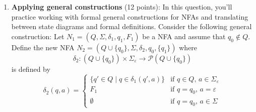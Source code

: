 \documentclass[12pt, oneside]{article}
\newcommand{\gradeCorrect}{({\it Graded for correctness}) }
\begin{document}
\begin{enumerate}[wide, labelwidth=!, labelindent=0pt]
For each of the regular expressions $R$ over the alphabet $\Sigma = \{a,b\}$ below, write the regular 
expression for~$\overline{L(R)}$. Your regular expressions may use the symbols
$\varnothing$, $\varepsilon$, $a$, $b$, and the 
following operations to combine them: union, concatenation, 
and Kleene star.

Briefly justify why your solution for each part works by giving plain English descriptions of the language 
described by the regular expression and of its complement and connecting them to the regular 
expression via relevant definitions. An English description that is more 
detailed than simply negating the description in the original language will likely be helpful in the justification.

Alternatively, you can justify your solution by first designing a DFA that recognizes $L(R)$, 
using the construction from class and the book to modify this DFA to get a new DFA that recognizes~$\overline{L(R)}$, 
and then applying the constructions from class and the book to convert this new DFA to a regular expression.

For each part of the question, clearly state which approach you're taking and include enough intermediate
steps to illustrate your work.


\begin{enumerate}
    \item\gradeCorrect $a^*b^*$
    \item\gradeCorrect $(a \cup b) a b^*$
\end{enumerate}


\item\textbf{Applying general constructions} (12 points):
In this question, you'll practice working with formal general constructions
for NFAs and translating between state diagrams and formal definitions.
Consider the following general construction: Let $N_1 = (Q, \Sigma, \delta_1, q_1, F_1)$ be a NFA
and assume that $q_0 \notin Q$.
Define the new NFA $N_2 = (Q \cup \{q_0\}, \Sigma, \delta_2, q_0, \{q_1\})$ where 
$$\delta_2: (Q \cup \{q_0\}) \times \Sigma_\varepsilon \to \mathcal{P} (Q \cup \{q_0\})$$ is defined by
\[
    \delta_2 (q,a) = \begin{cases}
        \{ q' \in Q \mid q \in \delta_1(q',a)\} &\text{if $q \in Q$, $a \in \Sigma_{\varepsilon}$} \\
        F_1 &\text{if $q =q_0$, $a = \varepsilon$}\\
        \emptyset &\text{if $q = q_0$, $a \in \Sigma$}
    \end{cases}
\]


\end{enumerate}
\end{document}
